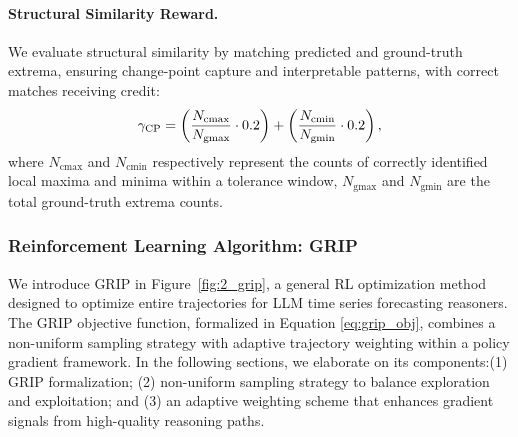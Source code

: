 \paragraph{Structural Similarity Reward.}
We evaluate structural similarity by matching predicted and ground-truth extrema, ensuring change-point capture and interpretable patterns, with correct matches receiving credit:
\begin{equation}
\gamma_{\text{CP}} = \left(\frac{N_{\text{cmax}}}{N_{\text{gmax}}} \cdot 0.2 \right) + \left(\frac{N_{\text{cmin}}}{N_{\text{gmin}}} \cdot 0.2\right),
	\setlength{\abovedisplayskip}{2pt}
	\setlength{\belowdisplayskip}{2pt}
\end{equation}
where $N_{\text{cmax}}$ and $N_{\text{cmin}}$ respectively represent the counts of correctly identified local maxima and minima within a tolerance window, $N_{\text{gmax}}$ and $N_{\text{gmin}}$ are the total ground-truth extrema counts.


\subsubsection{Reinforcement Learning Algorithm: GRIP}
We introduce GRIP in Figure~\ref{fig:2_grip}, a general RL optimization method designed to optimize entire trajectories for LLM time series forecasting reasoners. The GRIP objective function, formalized in Equation \ref{eq:grip_obj}, combines a non-uniform sampling strategy with adaptive trajectory weighting within a policy gradient framework. In the following sections, we elaborate on its components:(1) GRIP formalization; (2) non-uniform sampling strategy to balance exploration and exploitation; and (3) an adaptive weighting scheme that enhances gradient signals from high-quality reasoning paths. 








